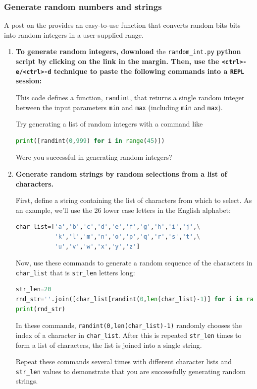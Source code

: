 \subsubsection{\howto Generate random numbers and strings}
A post on the  provides an easy-to-use function that converts random bits bits into random integers in a user-supplied range.
\begin{enumerate}
	\item \textbf{To generate random integers, download} the \lstinline{random_int.py} \textbf{python script by clicking on the link in the margin. Then, use the \lstinline{<ctrl>-e/<ctrl>-d} technique to paste the following commands into a \texttt{REPL} session:}
	
	
	This code defines a function, \lstinline{randint}, that returns a single random integer between the input parameters \texttt{min} and \texttt{max} (including \texttt{min} and \texttt{max}).
	
	Try generating a list of random integers with a command like
\begin{lstlisting}[language=Python]
print([randint(0,999) for i in range(45)])
\end{lstlisting}
	Were you successful in generating random integers?	

	\item \textbf{Generate random strings by random selections from a list of characters.}
	
	First, define a string containing the list of characters from which to select. 
	As an example, we'll use the 26 lower case letters in the English alphabet:
\begin{lstlisting}[language=Python]
char_list=['a','b','c','d','e','f','g','h','i','j',\
           'k','l','m','n','o','p','q','r','s','t',\
           'u','v','w','x','y','z']
\end{lstlisting}
	Now, use these commands to generate a random sequence of the characters in \lstinline{char_list} that is \lstinline{str_len} letters long:
\begin{lstlisting}[language=Python]
str_len=20
rnd_str=''.join([char_list[randint(0,len(char_list)-1)] for i in range(str_len)])
print(rnd_str)
\end{lstlisting}
	In these commands, \lstinline{randint(0,len(char_list)-1)} randomly chooses the index of a character in \lstinline{char_list}.
	After this is repeated \lstinline{str_len} times to form a list of characters, the list is joined into a single string.
		
	Repeat these commands several times with different character lists and \lstinline{str_len} values to demonstrate that you are successfully generating random strings.

\end{enumerate}


